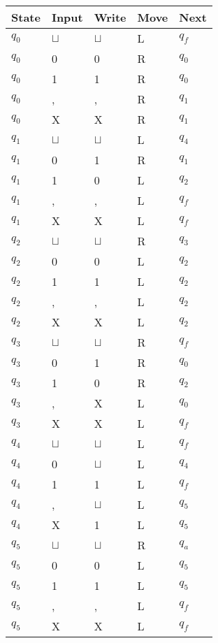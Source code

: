 \documentclass[a4paper, hidelinks, twocolumn, 9pt]{article}
\newcommand{\blm}{\sqcup}
\newcommand{\bl}{\(\blm\)}
\begin{document}
  \begin{center}
    \begin{tabular}{x{1cm}x{1cm}x{1cm}x{1cm}x{1cm}}
      \toprule
      State & Input & Write & Move & Next \\
      \midrule
      \(q_0\) & \bl & \bl & L & \(q_f\) \\
      \(q_0\) &   0 &   0 & R & \(q_0\) \\
      \(q_0\) &   1 &   1 & R & \(q_0\) \\
      \(q_0\) &   , &   , & R & \(q_1\) \\
      \(q_0\) &   X &   X & R & \(q_1\) \\
      \midrule
      \(q_1\) & \bl & \bl & L & \(q_4\) \\
      \(q_1\) &   0 &   1 & R & \(q_1\) \\
      \(q_1\) &   1 &   0 & L & \(q_2\) \\
      \(q_1\) &   , &   , & L & \(q_f\) \\
      \(q_1\) &   X &   X & L & \(q_f\) \\
      \(q_2\) & \bl & \bl & R & \(q_3\) \\
      \(q_2\) &   0 &   0 & L & \(q_2\) \\
      \(q_2\) &   1 &   1 & L & \(q_2\) \\
      \(q_2\) &   , &   , & L & \(q_2\) \\
      \(q_2\) &   X &   X & L & \(q_2\) \\
      \midrule
      \(q_3\) & \bl & \bl & R & \(q_f\) \\
      \(q_3\) &   0 &   1 & R & \(q_0\) \\
      \(q_3\) &   1 &   0 & R & \(q_2\) \\
      \(q_3\) &   , &   X & L & \(q_0\) \\
      \(q_3\) &   X &   X & L & \(q_f\) \\
      \midrule
      \(q_4\) & \bl & \bl & L & \(q_f\) \\
      \(q_4\) &   0 & \bl & L & \(q_4\) \\
      \(q_4\) &   1 &   1 & L & \(q_f\) \\
      \(q_4\) &   , & \bl & L & \(q_5\) \\
      \(q_4\) &   X &   1 & L & \(q_5\) \\
      \midrule
      \(q_5\) & \bl & \bl & R & \(q_a\) \\
      \(q_5\) &   0 &   0 & L & \(q_5\) \\
      \(q_5\) &   1 &   1 & L & \(q_5\) \\
      \(q_5\) &   , &   , & L & \(q_f\) \\
      \(q_5\) &   X &   X & L & \(q_f\) \\
      \bottomrule
    \end{tabular}
  \end{center}
\end{document}
